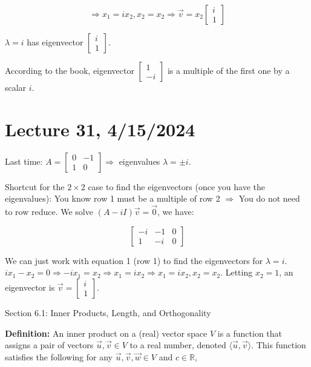\documentclass{article}
\begin{document}
\[ \Rightarrow x_1 = ix_2, x_2 = x_2 \Rightarrow \vec{v} = x_2 \left[ \begin{array}{c} i \\ 1 \end{array} \right] \]

$\lambda = i$ has eigenvector $\left[ \begin{array}{c} i \\ 1 \end{array} \right]$.

According to the book, eigenvector $\left[ \begin{array}{c} 1 \\ -i \end{array} \right]$ is a multiple of the first one by a scalar $i$.

\section{Lecture 31, 4/15/2024}


Last time: $A = \left[ \begin{array}{cc} 0 & -1 \\ 1 & 0 \end{array} \right] \Rightarrow$ eigenvalues $\lambda = \pm i$.

Shortcut for the $2 \times 2$ case to find the eigenvectors (once you have the eigenvalues): You know row 1 must be a multiple of row 2 $\Rightarrow$ You do not need to row reduce. We solve $(A - iI)\vec{v} = \vec{0}$, we have:

\[ \left[ \begin{array}{cc|c} -i & -1 & 0 \\ 1 & -i & 0 \end{array} \right] \]

We can just work with equation 1 (row 1) to find the eigenvectors for $\lambda = i$. $ix_1 - x_2 = 0 \Rightarrow -ix_1 = x_2 \Rightarrow x_1 = ix_2 \Rightarrow x_1 = ix_2, x_2 = x_2$. Letting $x_2 = 1$, an eigenvector is $\vec{v} = \left[ \begin{array}{c} i \\ 1 \end{array} \right]$.


Section 6.1: Inner Products, Length, and Orthogonality

\textbf{Definition:} An inner product on a (real) vector space \( V \) is a function that assigns a pair of vectors \( \vec{u}, \vec{v} \in V \) to a real number, denoted \( \langle \vec{u}, \vec{v} \rangle \). This function satisfies the following for any \( \vec{u}, \vec{v}, \vec{w} \in V \) and \( c \in \mathbb{R} \),
\end{document}
